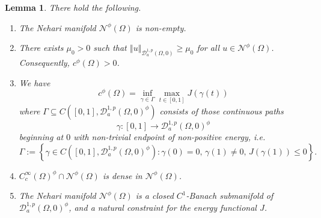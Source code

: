 \documentclass[10pt, reqno]{amsart}
\newcommand{\Om}{\Omega}
\newcommand{\norm}[1]{\left\Vert #1 \right\Vert}
\newcommand{\D}{\mathcal{D}}
\newcommand{\N}{\mathcal{N}}
\numberwithin{equation}{section}
\theoremstyle{definition}
\theoremstyle{remark}
\theoremstyle{plain}
\newtheorem{lem}[prop]{Lemma}
\begin{document}
	
	\begin{lem}\label{lem:nehariProperties}
		There hold the following.
		\begin{enumerate}
			\item The Nehari manifold $\N^\phi(\Om)$ is non-empty.
			\item There exists $\mu_0 > 0$ such that $\norm{u}_{\D_a^{1,p}(\Om,0)} \ge \mu_0$ for all $u \in \N^\phi(\Om)$. Consequently, $c^\phi(\Om) > 0$.
			\item We have 
			\[
			c^\phi(\Om) = \inf_{\gamma \in \Gamma} \max_{t \in [0,1]} J(\gamma(t))
			\]
			where $\Gamma \subseteq C\left([0,1], \D_a^{1,p}(\Om,0)^\phi\right)$ consists of those continuous paths $$\gamma : [0,1] \to \D_a^{1,p}(\Om, 0)^\phi$$ beginning at $0$ with non-trivial endpoint of non-positive energy, i.e.
			\[
			\Gamma := \left\{ \gamma \in C\left([0,1], \D_a^{1,p}(\Om,0)^\phi\right) : \gamma(0) = 0,\, \gamma(1) \ne 0,\, J(\gamma(1)) \le 0\right\}.
			\]
			\item $C_c^\infty(\Om)^\phi \cap \N^\phi(\Om)$ is dense in $\N^\phi(\Om)$.
			\item The Nehari manifold $\N^\phi(\Om)$ is a closed $C^1$-Banach submanifold of $\D_a^{1,p}(\Om,0)^\phi$, and a natural constraint for the energy functional $J$.
		\end{enumerate}
	\end{lem}
\end{document}

